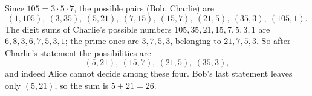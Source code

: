 Since $105=3\cdot5\cdot7$, the possible pairs (Bob, Charlie) are
\[(1,105),\ (3,35),\ (5,21),\ (7,15),\ (15,7),\ (21,5),\ (35,3),\ (105,1).\]
The digit sums of Charlie's possible numbers $105,35,21,15,7,5,3,1$ are $6,8,3,6,7,5,3,1$; the prime ones are $3,7,5,3$, belonging to $21,7,5,3$. So after Charlie's statement the possibilities are
\[(5,21),\ (15,7),\ (21,5),\ (35,3),\]
and indeed Alice cannot decide among these four. Bob's last statement leaves only $(5,21)$, so the sum is $5+21=\boxed{26}$.

